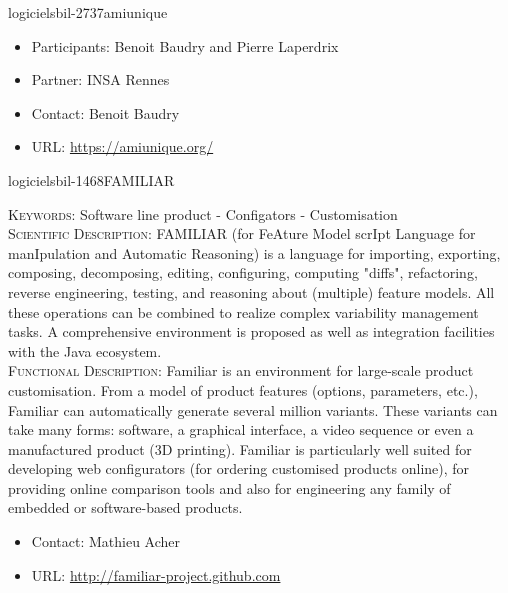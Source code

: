 \documentclass{ra2018}
\begin{document}
\begin{module}{logiciels}{bil-2737}{amiunique}
   \begin{itemize}
      \item Participants: Benoit Baudry and Pierre Laperdrix
      \item Partner: INSA Rennes
      \item Contact: Benoit Baudry
      \item URL: \url{https://amiunique.org/}
   \end{itemize}

 \end{module}

 \begin{module}{logiciels}{bil-1468}{FAMILIAR}

   \textsc{Keywords:} Software line product - Configators - Customisation \\ 


    \textsc{Scientific Description:} FAMILIAR (for FeAture Model scrIpt Language for manIpulation and Automatic Reasoning) is a language for importing, exporting, composing, decomposing, editing, configuring, computing "diffs", refactoring, reverse engineering, testing, and reasoning about (multiple) feature models. All these operations can be combined to realize complex variability management tasks. 
A comprehensive environment is proposed as well as integration facilities with the Java ecosystem.\\

 \textsc{Functional Description:}  Familiar is an environment for large-scale product customisation. From a model of product features (options, parameters, etc.), Familiar can automatically generate several million variants. These variants can take many forms: software, a graphical interface, a video sequence or even a manufactured product (3D printing). Familiar is particularly well suited for developing web configurators (for ordering customised products online), for providing online comparison tools and also for engineering any family of embedded or software-based products.\\

   \begin{itemize}
      \item Contact: Mathieu Acher
      \item URL: \url{http://familiar-project.github.com}
   \end{itemize}

 \end{module}
\end{document}

